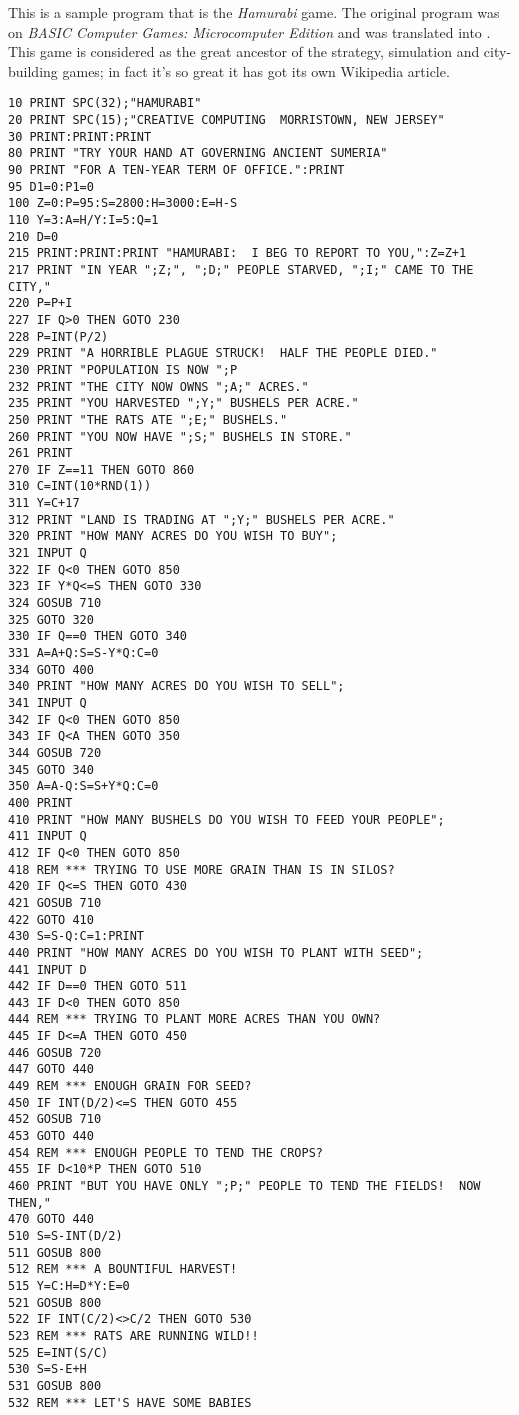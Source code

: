 This is a sample program that is the \emph{Hamurabi} game. The original program was on \emph{BASIC Computer Games: Microcomputer Edition} and was translated into \tbas. This game is considered as the great ancestor of the strategy, simulation and city-building games; in fact it's so great it has got its own Wikipedia article.

\begin{lstlisting}
10 PRINT SPC(32);"HAMURABI"
20 PRINT SPC(15);"CREATIVE COMPUTING  MORRISTOWN, NEW JERSEY"
30 PRINT:PRINT:PRINT
80 PRINT "TRY YOUR HAND AT GOVERNING ANCIENT SUMERIA"
90 PRINT "FOR A TEN-YEAR TERM OF OFFICE.":PRINT
95 D1=0:P1=0
100 Z=0:P=95:S=2800:H=3000:E=H-S
110 Y=3:A=H/Y:I=5:Q=1
210 D=0
215 PRINT:PRINT:PRINT "HAMURABI:  I BEG TO REPORT TO YOU,":Z=Z+1
217 PRINT "IN YEAR ";Z;", ";D;" PEOPLE STARVED, ";I;" CAME TO THE CITY,"
220 P=P+I
227 IF Q>0 THEN GOTO 230
228 P=INT(P/2)
229 PRINT "A HORRIBLE PLAGUE STRUCK!  HALF THE PEOPLE DIED."
230 PRINT "POPULATION IS NOW ";P
232 PRINT "THE CITY NOW OWNS ";A;" ACRES."
235 PRINT "YOU HARVESTED ";Y;" BUSHELS PER ACRE."
250 PRINT "THE RATS ATE ";E;" BUSHELS."
260 PRINT "YOU NOW HAVE ";S;" BUSHELS IN STORE."
261 PRINT
270 IF Z==11 THEN GOTO 860
310 C=INT(10*RND(1))
311 Y=C+17
312 PRINT "LAND IS TRADING AT ";Y;" BUSHELS PER ACRE."
320 PRINT "HOW MANY ACRES DO YOU WISH TO BUY";
321 INPUT Q
322 IF Q<0 THEN GOTO 850
323 IF Y*Q<=S THEN GOTO 330
324 GOSUB 710
325 GOTO 320
330 IF Q==0 THEN GOTO 340
331 A=A+Q:S=S-Y*Q:C=0
334 GOTO 400
340 PRINT "HOW MANY ACRES DO YOU WISH TO SELL";
341 INPUT Q
342 IF Q<0 THEN GOTO 850
343 IF Q<A THEN GOTO 350
344 GOSUB 720
345 GOTO 340
350 A=A-Q:S=S+Y*Q:C=0
400 PRINT
410 PRINT "HOW MANY BUSHELS DO YOU WISH TO FEED YOUR PEOPLE";
411 INPUT Q
412 IF Q<0 THEN GOTO 850
418 REM *** TRYING TO USE MORE GRAIN THAN IS IN SILOS?
420 IF Q<=S THEN GOTO 430
421 GOSUB 710
422 GOTO 410
430 S=S-Q:C=1:PRINT
440 PRINT "HOW MANY ACRES DO YOU WISH TO PLANT WITH SEED";
441 INPUT D
442 IF D==0 THEN GOTO 511
443 IF D<0 THEN GOTO 850
444 REM *** TRYING TO PLANT MORE ACRES THAN YOU OWN?
445 IF D<=A THEN GOTO 450
446 GOSUB 720
447 GOTO 440
449 REM *** ENOUGH GRAIN FOR SEED?
450 IF INT(D/2)<=S THEN GOTO 455
452 GOSUB 710
453 GOTO 440
454 REM *** ENOUGH PEOPLE TO TEND THE CROPS?
455 IF D<10*P THEN GOTO 510
460 PRINT "BUT YOU HAVE ONLY ";P;" PEOPLE TO TEND THE FIELDS!  NOW THEN,"
470 GOTO 440
510 S=S-INT(D/2)
511 GOSUB 800
512 REM *** A BOUNTIFUL HARVEST!
515 Y=C:H=D*Y:E=0
521 GOSUB 800
522 IF INT(C/2)<>C/2 THEN GOTO 530
523 REM *** RATS ARE RUNNING WILD!!
525 E=INT(S/C)
530 S=S-E+H
531 GOSUB 800
532 REM *** LET'S HAVE SOME BABIES

\end{lstlisting}
